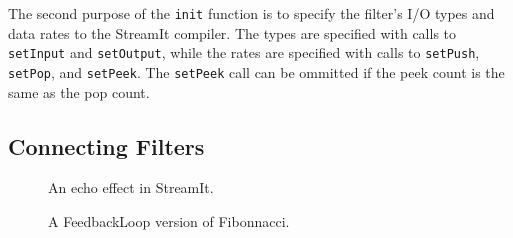 The second purpose of the {\tt init} function is to specify the
filter's I/O types and data rates to the StreamIt compiler.  The types
are specified with calls to {\tt setInput} and {\tt setOutput}, while
the rates are specified with calls to {\tt setPush}, {\tt setPop}, and
{\tt setPeek}.  The {\tt setPeek} call can be ommitted if the peek
count is the same as the pop count.



\subsection{Connecting Filters}
\label{sec:connecting}

\begin{figure}[t]
\begin{minipage}{3in}
\vspace{-8pt}
\caption{\protect\small An echo effect in StreamIt.
\protect\label{fig:echo}}
\end{minipage}
\hspace{0.2in}
\begin{minipage}{3in}
\vspace{8pt}
\caption{\protect\small A FeedbackLoop version of Fibonnacci.
\protect\label{fig:feed}}
\end{minipage}
\vspace{-2pt}
\end{figure}

